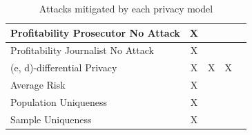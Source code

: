 \documentclass[12pt, a4paper,oneside]{report}
\begin{document}
\begin{table}[]
{\begin{tabular}{|l|c|c|c|c|}
			Profitability Prosecutor No Attack                    & X                                                                              &                                                                                   &                                                                              &                                                                                     \\ \hline
			Profitability Journalist No Attack                    & X                                                                              &                                                                                   &                                                                              &                                                                                     \\ \hline
			(e, d)-differential Privacy                           & X                                                                              & X                                                                                 & X                                                                            &                                                                                     \\ \hline
			Average Risk                                          & X                                                                              &                                                                                   &                                                                              &                                                                                     \\ \hline
			Population Uniqueness                                 & X                                                                              &                                                                                   &                                                                              &                                                                                     \\ \hline
			Sample Uniqueness                                     & X                                                                              &                                                                                   &                                                                              &                                                                                     \\ \hline
		\end{tabular}%
	}
\caption{Attacks mitigated by each privacy model}
\label{table:1}
\end{table}
 
\end{document}
